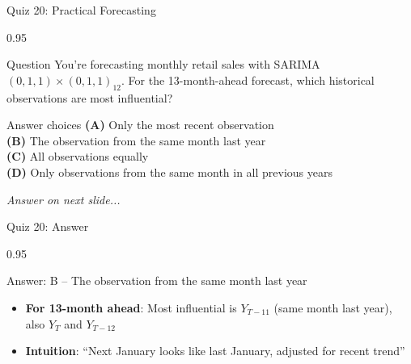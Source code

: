 \documentclass[9pt, aspectratio=169, t]{beamer}
\begin{document}
\begin{frame}{Quiz 20: Practical Forecasting}
    \begin{cminipage}{0.95\textwidth}
    \begin{alertblock}{Question}
        You're forecasting monthly retail sales with SARIMA$(0,1,1) \times (0,1,1)_{12}$. For the 13-month-ahead forecast, which historical observations are most influential?
    \end{alertblock}

    \vspace{0.4cm}

    \begin{block}{Answer choices}
        \textcolor{MainBlue}{\textbf{(A)}} Only the most recent observation\\[3pt]
        \textcolor{MainBlue}{\textbf{(B)}} The observation from the same month last year\\[3pt]
        \textcolor{MainBlue}{\textbf{(C)}} All observations equally\\[3pt]
        \textcolor{MainBlue}{\textbf{(D)}} Only observations from the same month in all previous years
    \end{block}

    \vspace{0.5cm}

    \begin{center}
        \textit{Answer on next slide...}
    \end{center}
    \end{cminipage}
\end{frame}

\begin{frame}{Quiz 20: Answer}
    \begin{cminipage}{0.95\textwidth}
    \begin{exampleblock}{Answer: B -- The observation from the same month last year}
        \begin{itemize}
            \item \textbf{For 13-month ahead}: Most influential is $Y_{T-11}$ (same month last year), also $Y_T$ and $Y_{T-12}$
            \item \textbf{Intuition}: ``Next January looks like last January, adjusted for recent trend''
        \end{itemize}
    \end{exampleblock}

    \end{cminipage}
\end{frame}
\end{document}
